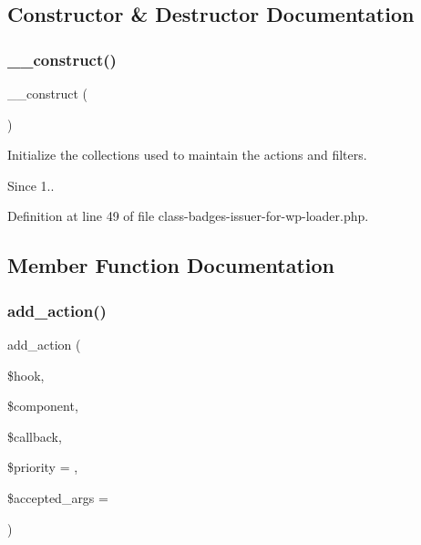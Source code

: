 \subsection{Constructor \& Destructor Documentation}
\mbox{\label{class_badges___issuer___for___wp___loader_a095c5d389db211932136b53f25f39685}} 
\subsubsection{\texorpdfstring{\+\_\+\+\_\+construct()}{\_\_construct()}}
{\footnotesize\ttfamily \+\_\+\+\_\+construct (\begin{DoxyParamCaption}{ }\end{DoxyParamCaption})}

Initialize the collections used to maintain the actions and filters.

\begin{DoxySince}{Since}
1.. 
\end{DoxySince}


Definition at line 49 of file class-\/badges-\/issuer-\/for-\/wp-\/loader.\+php.



\subsection{Member Function Documentation}
\mbox{\label{class_badges___issuer___for___wp___loader_ac0fb7e8a456ea81a1c30020f851f6c36}} 
\subsubsection{\texorpdfstring{add\+\_\+action()}{add\_action()}}
{\footnotesize\ttfamily add\+\_\+action (\begin{DoxyParamCaption}\item[{}]{\$hook,  }\item[{}]{\$component,  }\item[{}]{\$callback,  }\item[{}]{\$priority = {},  }\item[{}]{\$accepted\+\_\+args = {} }\end{DoxyParamCaption})}

